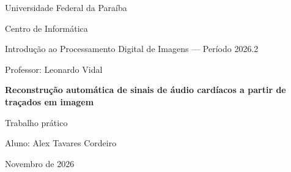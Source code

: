 \begin{titlepage}
\centering
{\large Universidade Federal da Paraíba\par}
{\large Centro de Informática\par}
\vspace{0.4cm}
{\large Introdução ao Processamento Digital de Imagens --- Período 2026.2\par}
{\large Professor: Leonardo Vidal\par}

\vspace{3.2cm}
{\LARGE\bfseries Reconstrução automática de sinais de áudio cardíacos a partir de traçados em imagem\par}
\vspace{0.8cm}
{\large Trabalho prático\par}

\vspace{3.5cm}
{\large Aluno: Alex Tavares Cordeiro\par}

\vfill
{\large Novembro de 2026\par}
\end{titlepage}

\begin{abstract}
\noindent Este trabalho reconstrói, a partir de uma imagem, três sinais de áudio de sons cardíacos: um sem sopro (Normal), um com o sopro inocente de Still e um com o sopro patológico de comunicação interventricular (VSD). A imagem é a Figura~1 do artigo de Tomas et al.\ (2011), que mostra os três sinais como gráficos em função do tempo. O programa, escrito em Python, isola cada gráfico, remove a grade, os eixos, os textos e as anotações, extrai a curva, calibra o eixo do tempo e o da amplitude, e grava os arquivos \texttt{normal.wav}, \texttt{still.wav} e \texttt{vsd.wav} (5000 amostras por segundo, 16 bits, mono). A filtragem espacial usa uma função de correlação bidimensional escrita do zero, no domínio do espaço, com preenchimento por zeros. A remoção da grade usa uma medida de cor que não depende do fundo, e a extração usa uma regra por coluna que preserva a amplitude dos picos. A análise dos sinais reconstruídos reproduz sete de oito afirmações do artigo: o tom do sopro de Still fica em 120~Hz, e o sopro do VSD tem banda larga. A figura entrega 1333 colunas por segundo, o que limita o conteúdo recuperável a cerca de 667~Hz.

\medskip
\noindent\textbf{Palavras-chave:} processamento digital de imagens; correlação espacial; extração de curvas; sons cardíacos; sopro de Still; comunicação interventricular.
\end{abstract}
\clearpage
